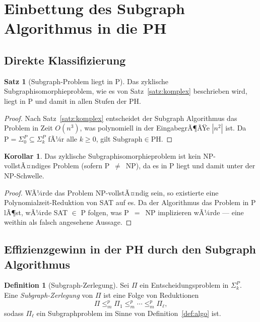 ﻿\documentclass[a4paper,12pt]{article}
\theoremstyle{definition}
\newtheorem{definition}{Definition}
\newtheorem{satz}{Satz}
\newtheorem{korollar}{Korollar}
\begin{document}
\section{Einbettung des Subgraph Algorithmus in die PH}
\label{sec:einbettung}

\subsection{Direkte Klassifizierung}

\begin{satz}[Subgraph-Problem liegt in P]
\label{satz:in_p}
  Das zyklische Subgraphisomorphieproblem, wie es von Satz~\ref{satz:komplex}
  beschrieben wird, liegt in \textup{P} und damit in allen Stufen der PH.
\end{satz}

\begin{proof}
  Nach Satz~\ref{satz:komplex} entscheidet der Subgraph Algorithmus das Problem
  in Zeit $O(n^3)$, was polynomiell in der EingabegrÃ¶ÃŸe $|n^2|$ ist.
  Da $\mathrm{P} = \Sigma_0^P \subseteq \Sigma_k^P$ fÃ¼r alle $k \geq 0$,
  gilt $\mathrm{Subgraph} \in \mathrm{PH}$.
\end{proof}

\begin{korollar}
  Das zyklische Subgraphisomorphieproblem ist kein NP-vollstÃ¤ndiges Problem
  (sofern P~$\neq$~NP), da es in P liegt und damit unter der NP-Schwelle.
\end{korollar}

\begin{proof}
  WÃ¼rde das Problem NP-vollstÃ¤ndig sein, so existierte eine Polynomialzeit-Reduktion
  von SAT auf es. Da der Algorithmus das Problem in P lÃ¶st, wÃ¼rde SAT $\in$ P folgen,
  was P~$=$~NP implizieren wÃ¼rde --- eine weithin als falsch angesehene Aussage.
\end{proof}

\subsection{Effizienzgewinn in der PH durch den Subgraph Algorithmus}

\begin{definition}[Subgraph-Zerlegung]
  Sei $\Pi$ ein Entscheidungsproblem in $\Sigma_k^P$.
  Eine \emph{Subgraph-Zerlegung} von $\Pi$ ist eine Folge von Reduktionen
  \[
    \Pi \leq_m^p \Pi_1 \leq_m^p \cdots \leq_m^p \Pi_\ell,
  \]
  sodass $\Pi_\ell$ ein Subgraphproblem im Sinne von Definition~\ref{def:algo} ist.
\end{definition}
\end{document}

